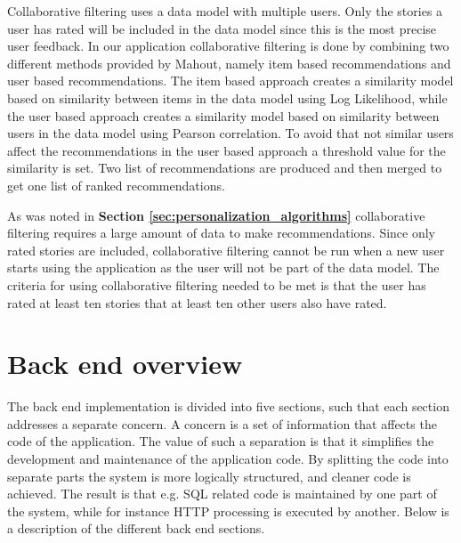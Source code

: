Collaborative filtering uses a data model with multiple users. Only the stories a user has rated will be included in the data model since this is the most precise user feedback. In our application collaborative filtering is done by combining two different methods provided by Mahout, namely item based recommendations and user based recommendations. The item based approach creates a similarity model based on similarity between items in the data model using Log Likelihood, while the user based approach creates a similarity model based on similarity between users in the data model using Pearson correlation. To avoid that not similar users affect the recommendations in the user based approach a threshold value for the similarity is set. Two list of recommendations are produced and then merged to get one list of ranked recommendations.\newline

As was noted in \textbf{Section \ref{sec:personalization_algorithms}} collaborative filtering requires a large amount of data to make recommendations. Since only rated stories are included, collaborative filtering cannot be run when a new user starts using the application as the user will not be part of the data model. The criteria for using collaborative filtering needed to be met is that the user has rated at least ten stories that at least ten other users also have rated. 

\section{Back end overview}
The back end implementation is divided into five sections, such that each section addresses a separate concern. A concern is a set of information that affects the code of the application. The value of such a separation is that it simplifies the development and maintenance of the application code. By splitting the code into separate parts the system is more logically structured, and cleaner code is achieved. The result is that e.g. SQL related code is maintained by one part of the system, while for instance HTTP processing is executed by another. Below is a description of the different back end sections.

